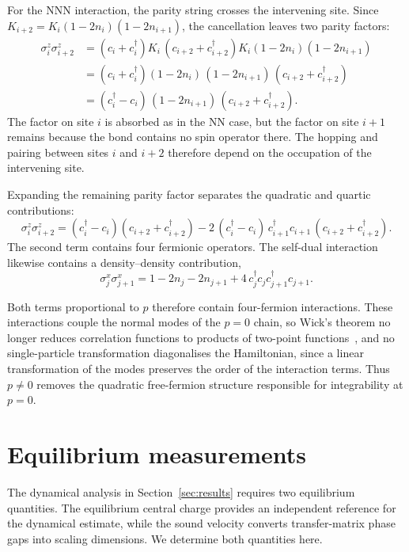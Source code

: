 For the \ac{NNN} interaction, the parity string crosses the intervening site. Since $K_{i+2}=K_i(1-2n_i)(1-2n_{i+1})$, the cancellation leaves two parity factors:
\begin{align}
  \sigma^z_i\sigma^z_{i+2}
   & = (c_i+c_i^{\dagger})K_i\,(c_{i+2}+c_{i+2}^{\dagger})K_i(1-2n_i)(1-2n_{i+1}) \nonumber \\
   & = (c_i+c_i^{\dagger})(1-2n_i)\,(1-2n_{i+1})\,(c_{i+2}+c_{i+2}^{\dagger}) \nonumber     \\
   & = (c_i^{\dagger}-c_i)\,(1-2n_{i+1})\,(c_{i+2}+c_{i+2}^{\dagger}).
  \label{eq:annni:hop}
\end{align}
The factor on site $i$ is absorbed as in the \ac{NN} case, but the factor on site $i+1$ remains because the bond contains no spin operator there. The hopping and pairing between sites $i$ and $i+2$ therefore depend on the occupation of the intervening site.

Expanding the remaining parity factor separates the quadratic and quartic contributions:
\begin{equation}
  \sigma^z_i\sigma^z_{i+2}
  = (c_i^{\dagger}-c_i)(c_{i+2}+c_{i+2}^{\dagger})
  - 2\,(c_i^{\dagger}-c_i)\,c^{\dagger}_{i+1}c_{i+1}\,(c_{i+2}+c_{i+2}^{\dagger}).
  \label{eq:annni:quartic}
\end{equation}
The second term contains four fermionic operators. The self-dual interaction likewise contains a density--density contribution,
\begin{equation}
  \sigma^x_j\sigma^x_{j+1}
  = 1-2n_j-2n_{j+1}+4\,c^{\dagger}_jc_j c^{\dagger}_{j+1}c_{j+1}.
  \label{eq:annni:xxquartic}
\end{equation}

Both terms proportional to $p$ therefore contain four-fermion interactions. These interactions couple the normal modes of the $p=0$ chain, so Wick's theorem no longer reduces correlation functions to products of two-point functions~\cite{wick1950}, and no single-particle transformation diagonalises the Hamiltonian, since a linear transformation of the modes preserves the order of the interaction terms. Thus $p\neq0$ removes the quadratic free-fermion structure responsible for integrability at $p=0$.


\FloatBarrier
\section{Equilibrium measurements}
\label{app:equilibrium}
The dynamical analysis in Section~\ref{sec:results} requires two equilibrium quantities. The equilibrium central charge provides an independent reference for the dynamical estimate, while the sound velocity converts transfer-matrix phase gaps into scaling dimensions. We determine both quantities here.

